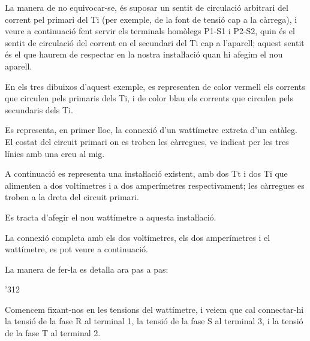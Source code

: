  La manera de no equivocar-se, és suposar un sentit de
circulació arbitrari del corrent  pel primari del Ti (per exemple,
de la font de tensió cap a la càrrega), i veure a continuació fent
servir els terminals homòlegs P1-S1 i P2-S2, quin és el sentit de
circulació del corrent en el secundari del Ti cap a l'aparell;
aquest sentit és el que haurem de respectar en la nostra
instaŀlació quan hi afegim el nou aparell.

	
\begin{exemple}[\ConnexWatt{}]
	\addcontentsxms{\ConnexWatt}
    En els tres dibuixos d'aquest exemple, es representen de color vermell els corrents que circulen pels primaris dels Ti, i de color blau els corrents que circulen pels secundaris dels Ti.

    Es representa, en primer lloc, la connexió d'un wattímetre extreta
    d'un catàleg.   El costat del circuit primari on es troben les càrregues, ve indicat
    per les tres línies amb una creu al mig.

    \begin{center}
        
    \end{center}

    A continuació es representa una instaŀlació existent, amb dos Tt i
    dos Ti que alimenten a dos voltímetres i a dos amperímetres
    respectivament; les càrregues es troben a la dreta del circuit
    primari.

    \begin{center}
        
    \end{center}

    Es tracta d'afegir el nou wattímetre a aquesta
    instaŀlació.

    La connexió completa amb els dos voltímetres, els dos amperímetres i el wattímetre, es pot veure a continuació.
    
      \begin{center}
    	
    \end{center}

    La manera de fer-la es detalla ara pas a pas:

    \begin{dingautolist}{'312}

    \item Comencem fixant-nos en les tensions del wattímetre, i veiem que cal
    connectar-hi la tensió de la fase R al terminal 1, la tensió de la
    fase S al terminal 3, i la tensió de la fase T al terminal 2.


\end{dingautolist}
\end{exemple}
